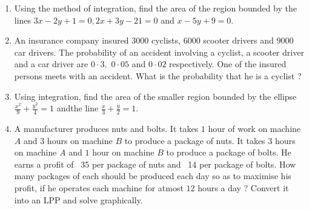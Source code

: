\documentclass[10pt,-letter paper]{article}
\begin{document}
\begin{enumerate}
\item Using the method of integration, find the area of the region bounded by the lines $3x - 2y + 1 = 0, 2x + 3y - 21 = 0$ and $x - 5y + 9 = 0$.
\item An insurance company insured $3000$ cyclists, $6000$ scooter drivers and $9000$ car drivers. The probability of an accident involving a cyclist, a scooter driver and a car driver are $0\cdot3,$ $0\cdot05$ and $0\cdot02$ respectively. One of the insured persons meets with an accident. What is the probability that he is a cyclist ?
\item Using integration, find the area of the smaller region bounded by the ellipse $\frac{x^{2}}{9}+\frac{y^{2}}{4}=1$ andthe line $\frac{x}{3}+\frac{y}{2}=1$.
\item A manufacturer produces nuts and bolts. It takes $1$ hour of work on machine $A$ and $3$ hours on machine $B$ to produce a package of nuts. It takes $3$ hours on machine $A$ and $1$ hour on machine $B$ to produce a package of bolts. He earns a profit of \rupee~35 per package of nuts and \rupee~14 per package of bolts. How many packages of each should be produced each day so as to maximise his profit, if he operates each machine for atmost $12$ hours a day ? Convert it into an LPP and solve graphically.
\end{enumerate}
\end{document}
